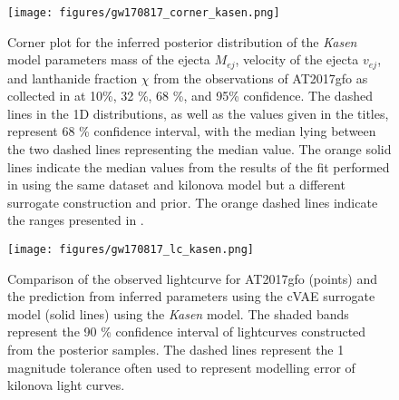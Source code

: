 \documentclass[fleqn,usenatbib,useAMS]{mnras}
\begin{document}
\begin{figure}
    \centering
    \texttt{[image: figures/gw170817\_corner\_kasen.png]}
    \caption{
    Corner plot for the inferred posterior distribution of the \emph{Kasen} model parameters mass of the ejecta $M_{ej}$, velocity of the ejecta $v_{ej}$, and lanthanide fraction $\chi$ from the observations of AT2017gfo as collected in \citet{coughlinConstraintsNeutronStar2018} at 10\%, 32 \%, 68 \%, and 95\% confidence. 
    The dashed lines in the 1D distributions, as well as the values given in the titles, represent 68 \% confidence interval, with the median lying between the two dashed lines representing the median value. 
    The orange solid lines indicate the median values from the results of the fit performed in \citet{coughlinConstraintsNeutronStar2018} using the same dataset and kilonova model but a different surrogate construction and prior. 
    The orange dashed lines indicate the ranges presented in \citet{coughlinConstraintsNeutronStar2018}. }
    \label{fig:fit_corner_kasen}
\end{figure}


\begin{figure}
    \centering
    \texttt{[image: figures/gw170817\_lc\_kasen.png]}
    \caption{Comparison of the observed lightcurve for AT2017gfo (points) and the prediction from inferred parameters using the cVAE surrogate model (solid lines) using the \emph{Kasen} model. The shaded bands represent the 90 \% confidence interval of lightcurves constructed from the posterior samples. The dashed lines represent the 1 magnitude tolerance often used to represent modelling error of kilonova light curves.}
    \label{fig:fit_lightcurve_kasen}
\end{figure}
\end{document}
